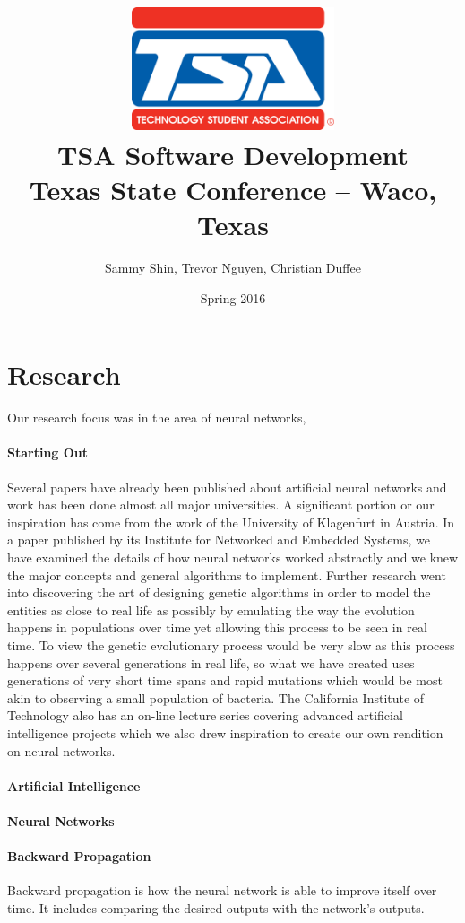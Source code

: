 \documentclass[letterpaper, 10pt]{article}
\title{
	\includegraphics[width=6.0cm]{res/TSA-Emblem.png} \\
	\vspace{1.15cm}
	TSA Software Development \\
	Texas State Conference -- Waco, Texas\\
	\vspace{0.75cm}
}
\author{Sammy Shin, Trevor Nguyen, Christian Duffee}
\date{Spring 2016}
\begin{document}
\maketitle

\cleardoublepage

\tableofcontents

\cleardoublepage
\section{Research}
	Our research focus was in the area of neural networks, 

	\paragraph{Starting Out}
	Several papers have already been published about artificial neural networks and work has been done almost all major universities. A significant portion or our inspiration has come from the work of the University of Klagenfurt in Austria. In a paper published by its Institute for Networked and Embedded Systems, we have examined the details of how neural networks worked abstractly and we knew the major concepts and general algorithms to implement. Further research went into discovering the art of designing genetic algorithms in order to model the entities as close to real life as possibly by emulating the way the evolution happens in populations over time yet allowing this process to be seen in real time. To view the genetic evolutionary process would be very slow as this process happens over several generations in real life, so what we have created uses generations of very short time spans and rapid mutations which would be most akin to observing a small population of bacteria. The California Institute of Technology also has an on-line lecture series covering advanced artificial intelligence projects which we also drew inspiration to create our own rendition on neural networks.
	
	\paragraph{Artificial Intelligence}
	
	\paragraph{Neural Networks}
	
	
	\paragraph{Backward Propagation}
	Backward propagation is how the neural network is able to improve itself over time. It includes comparing the desired outputs with the network's outputs.
	
\end{document}
